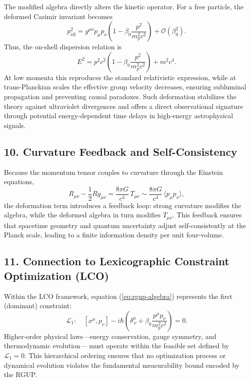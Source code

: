 \documentclass[11pt,oneside]{book}
\numberwithin{equation}{chapter}
\newcommand{\mpx}{m_p}               %
\newcommand{\betaz}{\beta_0}
\begin{document}
The modified algebra directly alters the kinetic operator.
For a free particle, the deformed Casimir invariant becomes
\begin{equation}
p^2_{\text{eff}} =
g^{\mu\nu}p_\mu p_\nu
\left(1 - \betaz\frac{p^2}{\mpx^2 c^2}\right) + \mathcal{O}(\betaz^2).
\end{equation}
Thus, the on-shell dispersion relation is
\begin{equation}
E^2 = p^2 c^2
\left(1 - \betaz\frac{p^2}{\mpx^2 c^2}\right) + m^2 c^4.
\end{equation}
At low momenta this reproduces the standard relativistic expression,
while at trans-Planckian scales the effective group velocity decreases,
ensuring subluminal propagation and preventing causal paradoxes.
Such deformation stabilizes the theory against ultraviolet divergences
and offers a direct observational signature through potential
energy-dependent time delays in high-energy astrophysical signals.

\subsection*{10. Curvature Feedback and Self-Consistency}

Because the momentum tensor couples to curvature through the Einstein equations,
\begin{equation}
R_{\mu\nu} - \frac{1}{2}Rg_{\mu\nu} = \frac{8\pi G}{c^4}\,T_{\mu\nu}
\sim \frac{8\pi G}{c^4}\,\langle p_\mu p_\nu\rangle,
\end{equation}
the deformation term introduces a feedback loop:
strong curvature modifies the algebra, while the deformed algebra in turn modifies $T_{\mu\nu}$.
This feedback ensures that spacetime geometry and quantum uncertainty
adjust self-consistently at the Planck scale, leading to a finite information density per unit four-volume.

\subsection*{11. Connection to Lexicographic Constraint Optimization (LCO)}

Within the LCO framework, equation (\ref{eq:rgup-algebra}) represents the first (dominant) constraint:
\begin{equation}
\mathcal{L}_1:\quad [x^\mu,p_\nu]-
i\hbar\left(\delta^\mu_{\ \nu}+\betaz\frac{p^\mu p_\nu}{\mpx^2 c^2}\right)=0.
\end{equation}
Higher-order physical laws—energy conservation, gauge symmetry, and thermodynamic evolution—
must operate within the feasible set defined by $\mathcal{L}_1=0$.
This hierarchical ordering ensures that no optimization process or dynamical evolution
violates the fundamental measurability bound encoded by the RGUP.
\end{document}
